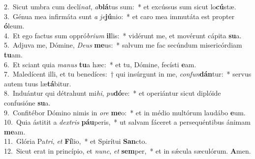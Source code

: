 {2.~}Sicut umbra cum declí\textit{nat}, \textit{a}\textbf{blá}tus sum:~* et excússus sum sicut lo\textbf{cú}stæ.\\
{3.~}Génua mea infirmáta sunt \textit{a} \textit{je}\textbf{jú}nio:~* et caro mea immutáta est propter \textbf{ó}leum.\\
{4.~}Et ego factus sum oppró\textit{bri}\textit{um} \textbf{il}lis:~* vidérunt me, et movérunt cápita \textbf{su}a.\\
{5.~}Adjuva me, Dómine, \textit{De}\textit{us} \textbf{me}us:~* salvum me fac secúndum misericórdiam \textbf{tu}am.\\
{6.~}Et sciant quia \textit{ma}\textit{nus} \textbf{tu}a hæc:~* et tu, Dómine, fecísti \textbf{e}am.\\
{7.~}Maledícent illi, et tu benedíces:~† qui insúrgunt in me, \textit{con}\textit{fun}\textbf{dán}tur:~* servus autem tuus læ\textbf{tá}bitur.\\
{8.~}Induántur qui détrahunt mi\textit{hi}, \textit{pu}\textbf{dó}re:~* et operiántur sicut diplóide confusióne \textbf{su}a.\\
{9.~}Confitébor Dómino nimis in \textit{o}\textit{re} \textbf{me}o:~* et in médio multórum laudábo \textbf{e}um.\\
{10.~}Quia ástitit a \textit{dex}\textit{tris} \textbf{páu}peris,~* ut salvam fáceret a persequéntibus ánimam \textbf{me}am.\\
{11.~}Glória Pa\textit{tri}, \textit{et} \textbf{Fí}lio,~* et Spirítui \textbf{San}cto.\\
{12.~}Sicut erat in princípio, et \textit{nunc}, \textit{et} \textbf{sem}per,~* et in sǽcula sæculórum. \textbf{A}men.\\
